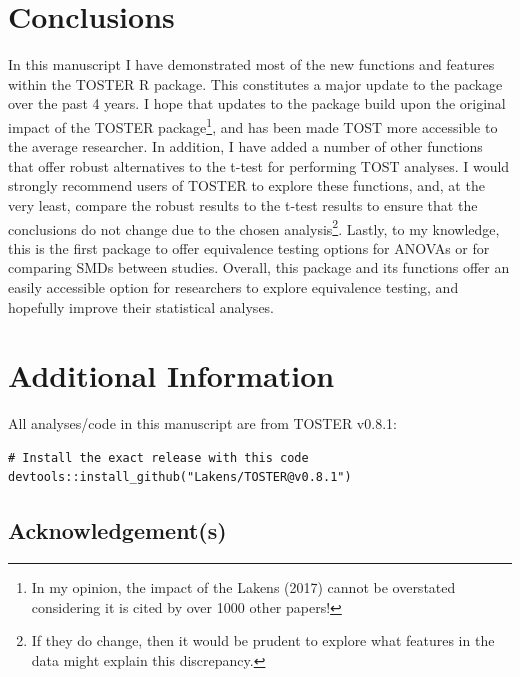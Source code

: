 \documentclass[
]{interact}
\begin{document}
\newpage

\hypertarget{conclusions}{%
\section{Conclusions}\label{conclusions}}

In this manuscript I have demonstrated most of the new functions and
features within the TOSTER R package. This constitutes a major update to
the package over the past 4 years. I hope that updates to the package
build upon the original impact of the TOSTER package\footnote{In my
  opinion, the impact of the Lakens (2017) cannot be overstated
  considering it is cited by over 1000 other papers!}, and has been made
TOST more accessible to the average researcher. In addition, I have
added a number of other functions that offer robust alternatives to the
t-test for performing TOST analyses. I would strongly recommend users of
TOSTER to explore these functions, and, at the very least, compare the
robust results to the t-test results to ensure that the conclusions do
not change due to the chosen analysis\footnote{If they do change, then
  it would be prudent to explore what features in the data might explain
  this discrepancy.}. Lastly, to my knowledge, this is the first package
to offer equivalence testing options for ANOVAs or for comparing SMDs
between studies. Overall, this package and its functions offer an easily
accessible option for researchers to explore equivalence testing, and
hopefully improve their statistical analyses.

\newpage

\hypertarget{additional-information}{%
\section{Additional Information}\label{additional-information}}

All analyses/code in this manuscript are from TOSTER v0.8.1:

\begin{verbatim}
# Install the exact release with this code
devtools::install_github("Lakens/TOSTER@v0.8.1")
\end{verbatim}

\hypertarget{acknowledgements}{%
\subsection*{Acknowledgement(s)}\label{acknowledgements}}
\end{document}
